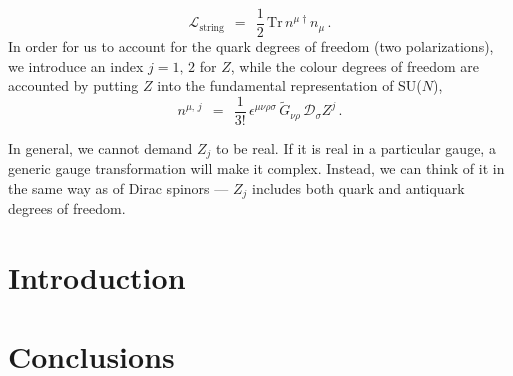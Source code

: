 \documentclass[epsfig,12pt]{article}
\def\beq{\begin{equation}}
\def\eeq{\end{equation}}
\newcommand{\wt}{\widetilde}
\newcommand{\md}{\mathcal{D}}
\newcommand{\ml}{\mathcal{L}}
\newcommand{\Tr}{\text{Tr}}
\begin{document}
\begin{titlepage}
\beq
	\ml_\text{string}    ~~=~~    \frac{1}{2}\, \Tr\, n^{\mu\dagger} n_\mu\,.
\eeq
	In order for us to account for the quark degrees of freedom (two polarizations),
	we introduce an index $ j = 1,\, 2 $ for $ Z $, while the colour degrees of freedom
	are accounted by putting $ Z $ into the fundamental representation of SU($N$),
\beq
	n^{\mu,\,j}    ~~=~~    \frac{1}{3!}\, \epsilon^{\mu\nu\rho\sigma}\,
					       \wt G{}_{\nu\rho}\, \md_\sigma Z^j\,.
\eeq

	In general, we cannot demand $ Z_j $ to be real.
	If it is real in a particular gauge, a generic gauge transformation will make it complex.
	Instead, we can think of it in the same way as of Dirac spinors --- $ Z_j $ includes
	both quark and antiquark degrees of freedom.

\vspace{2mm}

\end{titlepage}




\section{Introduction}
\setcounter{equation}{0}




\section{Conclusions}
\end{document}
